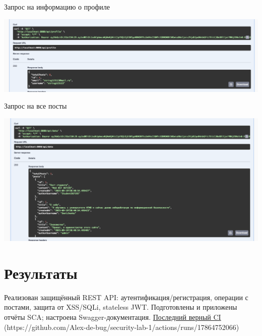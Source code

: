 \documentclass{article}
\begin{document}
Запрос на информацию о профиле
\begin{center}
    \includegraphics[width=.9\textwidth]{info.png}
\end{center}

Запрос на все посты 
\begin{center}
    \includegraphics[width=.9\textwidth]{posts}
\end{center}

\section*{Результаты}
Реализован защищённый REST API: аутентификация/регистрация, операции с постами, защита от XSS/SQLi, stateless JWT. Подготовлены и приложены отчёты SCA; настроена Swagger-документация.
\href{https://github.com/Alex-de-bug/security-lab-1/actions/runs/17864752066}{Последний верный CI} (https://github.com/Alex-de-bug/security-lab-1/actions/runs/17864752066)
\end{document}
